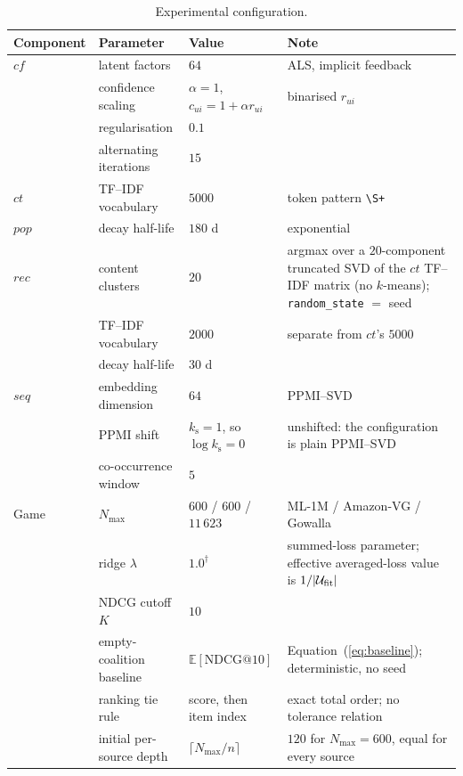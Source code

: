 \documentclass[pdflatex,sn-basic,Numbered]{sn-jnl}
\makeatletter
\theoremstyle{plain}
\theoremstyle{definition}
\newcommand{\NDCG}{\mathrm{NDCG@10}}
\makeatother
\begin{document}
\begin{table}[tbp]
\caption{Experimental configuration.}
\label{tab:hyper}
\footnotesize
\setlength{\tabcolsep}{3pt}
\begin{tabularx}{\textwidth}{@{}ll>{\raggedright\arraybackslash}p{}X@{}}
\toprule
Component & Parameter & Value & Note \\
\midrule
$cf$  & latent factors        & $64$    & ALS, implicit feedback \\
      & confidence scaling    & $\alpha = 1$, $c_{ui} = 1 + \alpha r_{ui}$ & binarised $r_{ui}$ \\
      & regularisation        & $0.1$   & \\
      & alternating iterations& $15$    & \\
$ct$  & TF--IDF vocabulary    & $5000$  & token pattern \texttt{\textbackslash S+} \\
$pop$ & decay half-life       & $180$ d & exponential \\
$rec$ & content clusters      & $20$    & argmax over a $20$-component truncated
                                            SVD of the $ct$ TF--IDF matrix (no
                                            $k$-means); \texttt{random\_state} $=$ seed \\
      & TF--IDF vocabulary      & $2000$  & separate from $ct$'s $5000$ \\
      & decay half-life       & $30$ d  & \\
$seq$ & embedding dimension   & $64$    & PPMI--SVD \\
      & PPMI shift            & $k_{\mathrm{s}} = 1$, so $\log k_{\mathrm{s}} = 0$ & unshifted: the configuration is plain PPMI--SVD \\
      & co-occurrence window  & $5$     & \\
\midrule
Game  & $N_{\max}$            & $600$ / $600$ / $11\,623$ & ML-1M / Amazon-VG / Gowalla \\
      & ridge $\lambda$       & $1.0^{\dagger}$ & summed-loss parameter; effective averaged-loss value is $1/|\mathcal U_{\rm fit}|$ \\
      & NDCG cutoff $K$       & $10$    & \\
      & empty-coalition baseline & $\mathbb{E}[\NDCG]$ & Equation~(\ref{eq:baseline}); deterministic, no seed \\
      & ranking tie rule      & score, then item index & exact total order; no tolerance relation \\
      & initial per-source depth & $\lceil N_{\max}/n \rceil$ & $120$ for $N_{\max}=600$, equal for every source \\

\end{tabularx}
\end{table}
\end{document}
